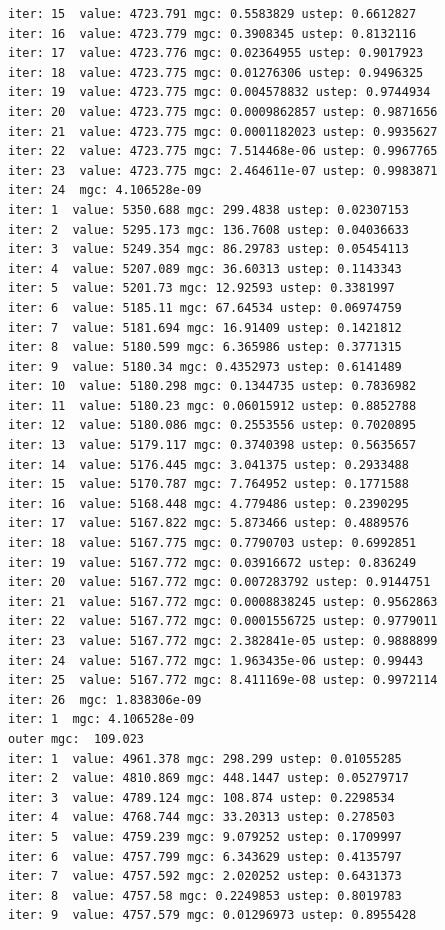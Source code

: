 \documentclass[
  letterpaper,
  DIV=11,
  numbers=noendperiod]{scrartcl}
\begin{document}
\begin{verbatim}
iter: 15  value: 4723.791 mgc: 0.5583829 ustep: 0.6612827 
iter: 16  value: 4723.779 mgc: 0.3908345 ustep: 0.8132116 
iter: 17  value: 4723.776 mgc: 0.02364955 ustep: 0.9017923 
iter: 18  value: 4723.775 mgc: 0.01276306 ustep: 0.9496325 
iter: 19  value: 4723.775 mgc: 0.004578832 ustep: 0.9744934 
iter: 20  value: 4723.775 mgc: 0.0009862857 ustep: 0.9871656 
iter: 21  value: 4723.775 mgc: 0.0001182023 ustep: 0.9935627 
iter: 22  value: 4723.775 mgc: 7.514468e-06 ustep: 0.9967765 
iter: 23  value: 4723.775 mgc: 2.464611e-07 ustep: 0.9983871 
iter: 24  mgc: 4.106528e-09 
iter: 1  value: 5350.688 mgc: 299.4838 ustep: 0.02307153 
iter: 2  value: 5295.173 mgc: 136.7608 ustep: 0.04036633 
iter: 3  value: 5249.354 mgc: 86.29783 ustep: 0.05454113 
iter: 4  value: 5207.089 mgc: 36.60313 ustep: 0.1143343 
iter: 5  value: 5201.73 mgc: 12.92593 ustep: 0.3381997 
iter: 6  value: 5185.11 mgc: 67.64534 ustep: 0.06974759 
iter: 7  value: 5181.694 mgc: 16.91409 ustep: 0.1421812 
iter: 8  value: 5180.599 mgc: 6.365986 ustep: 0.3771315 
iter: 9  value: 5180.34 mgc: 0.4352973 ustep: 0.6141489 
iter: 10  value: 5180.298 mgc: 0.1344735 ustep: 0.7836982 
iter: 11  value: 5180.23 mgc: 0.06015912 ustep: 0.8852788 
iter: 12  value: 5180.086 mgc: 0.2553556 ustep: 0.7020895 
iter: 13  value: 5179.117 mgc: 0.3740398 ustep: 0.5635657 
iter: 14  value: 5176.445 mgc: 3.041375 ustep: 0.2933488 
iter: 15  value: 5170.787 mgc: 7.764952 ustep: 0.1771588 
iter: 16  value: 5168.448 mgc: 4.779486 ustep: 0.2390295 
iter: 17  value: 5167.822 mgc: 5.873466 ustep: 0.4889576 
iter: 18  value: 5167.775 mgc: 0.7790703 ustep: 0.6992851 
iter: 19  value: 5167.772 mgc: 0.03916672 ustep: 0.836249 
iter: 20  value: 5167.772 mgc: 0.007283792 ustep: 0.9144751 
iter: 21  value: 5167.772 mgc: 0.0008838245 ustep: 0.9562863 
iter: 22  value: 5167.772 mgc: 0.0001556725 ustep: 0.9779011 
iter: 23  value: 5167.772 mgc: 2.382841e-05 ustep: 0.9888899 
iter: 24  value: 5167.772 mgc: 1.963435e-06 ustep: 0.99443 
iter: 25  value: 5167.772 mgc: 8.411169e-08 ustep: 0.9972114 
iter: 26  mgc: 1.838306e-09 
iter: 1  mgc: 4.106528e-09 
outer mgc:  109.023 
iter: 1  value: 4961.378 mgc: 298.299 ustep: 0.01055285 
iter: 2  value: 4810.869 mgc: 448.1447 ustep: 0.05279717 
iter: 3  value: 4789.124 mgc: 108.874 ustep: 0.2298534 
iter: 4  value: 4768.744 mgc: 33.20313 ustep: 0.278503 
iter: 5  value: 4759.239 mgc: 9.079252 ustep: 0.1709997 
iter: 6  value: 4757.799 mgc: 6.343629 ustep: 0.4135797 
iter: 7  value: 4757.592 mgc: 2.020252 ustep: 0.6431373 
iter: 8  value: 4757.58 mgc: 0.2249853 ustep: 0.8019783 
iter: 9  value: 4757.579 mgc: 0.01296973 ustep: 0.8955428 

\end{verbatim}
\end{document}
